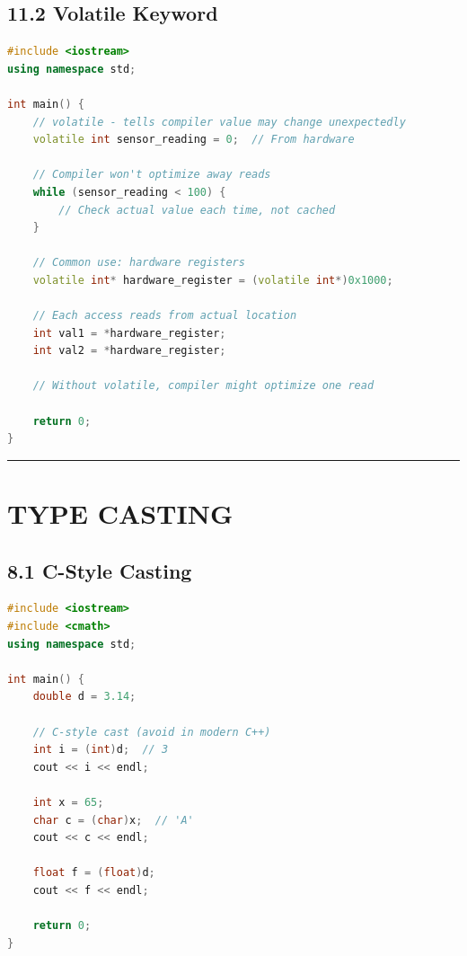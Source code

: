 \hypertarget{volatile-keyword}{%
\subsection{11.2 Volatile Keyword}\label{volatile-keyword}}

\begin{lstlisting}[language={C++}]
#include <iostream>
using namespace std;

int main() {
    // volatile - tells compiler value may change unexpectedly
    volatile int sensor_reading = 0;  // From hardware

    // Compiler won't optimize away reads
    while (sensor_reading < 100) {
        // Check actual value each time, not cached
    }

    // Common use: hardware registers
    volatile int* hardware_register = (volatile int*)0x1000;

    // Each access reads from actual location
    int val1 = *hardware_register;
    int val2 = *hardware_register;

    // Without volatile, compiler might optimize one read

    return 0;
}
\end{lstlisting}

\begin{center}\rule{0.5\linewidth}{0.5pt}\end{center}

\hypertarget{type-casting}{%
\section{TYPE CASTING}\label{type-casting}}

\hypertarget{c-style-casting}{%
\subsection{8.1 C-Style Casting}\label{c-style-casting}}

\begin{lstlisting}[language={C++}]
#include <iostream>
#include <cmath>
using namespace std;

int main() {
    double d = 3.14;

    // C-style cast (avoid in modern C++)
    int i = (int)d;  // 3
    cout << i << endl;

    int x = 65;
    char c = (char)x;  // 'A'
    cout << c << endl;

    float f = (float)d;
    cout << f << endl;

    return 0;
}
\end{lstlisting}

